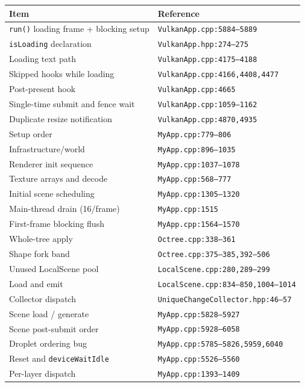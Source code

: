 \documentclass[11pt,a4paper]{article}
\begin{document}
{\footnotesize
\begin{longtable}{@{}L{8.2cm}L{7.0cm}@{}}
\toprule
\textbf{Item} & \textbf{Reference} \\
\midrule
\endhead
\texttt{run()} loading frame + blocking setup & \texttt{VulkanApp.cpp:5884--5889} \\
\texttt{isLoading} declaration & \texttt{VulkanApp.hpp:274--275} \\
Loading text path & \texttt{VulkanApp.cpp:4175--4188} \\
Skipped hooks while loading & \texttt{VulkanApp.cpp:4166,4408,4477} \\
Post-present hook & \texttt{VulkanApp.cpp:4665} \\
Single-time submit and fence wait & \texttt{VulkanApp.cpp:1059--1162} \\
Duplicate resize notification & \texttt{VulkanApp.cpp:4870,4935} \\
Setup order & \texttt{MyApp.cpp:779--806} \\
Infrastructure/world & \texttt{MyApp.cpp:896--1035} \\
Renderer init sequence & \texttt{MyApp.cpp:1037--1078} \\
Texture arrays and decode & \texttt{MyApp.cpp:568--777} \\
Initial scene scheduling & \texttt{MyApp.cpp:1305--1320} \\
Main-thread drain (16/frame) & \texttt{MyApp.cpp:1515} \\
First-frame blocking flush & \texttt{MyApp.cpp:1564--1570} \\
Whole-tree apply & \texttt{Octree.cpp:338--361} \\
Shape fork band & \texttt{Octree.cpp:375--385,392--506} \\
Unused LocalScene pool & \texttt{LocalScene.cpp:280,289--299} \\
Load and emit & \texttt{LocalScene.cpp:834--850,1004--1014} \\
Collector dispatch & \texttt{UniqueChangeCollector.hpp:46--57} \\
Scene load / generate & \texttt{MyApp.cpp:5828--5927} \\
Scene post-submit order & \texttt{MyApp.cpp:5928--6058} \\
Droplet ordering bug & \texttt{MyApp.cpp:5785--5826,5959,6040} \\
Reset and \texttt{deviceWaitIdle} & \texttt{MyApp.cpp:5526--5560} \\
Per-layer dispatch & \texttt{MyApp.cpp:1393--1409} \\

\end{longtable}}
\end{document}
